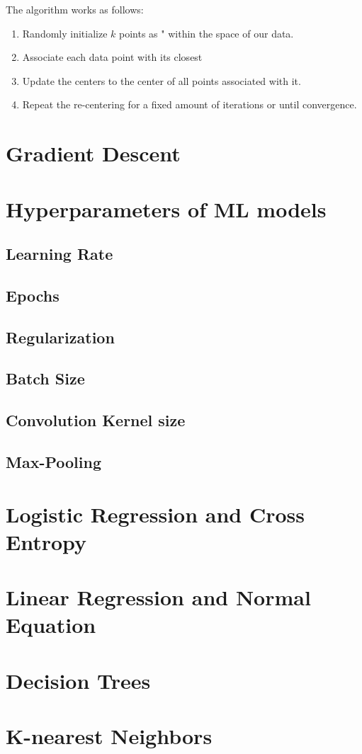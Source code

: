 The algorithm works as follows:
\begin{enumerate}
    \item Randomly initialize $k$ points as " within the space of our data.
    \item Associate each data point with its closest 
    \item Update the centers to the center of all points associated with it.
    \item Repeat the re-centering for a fixed amount of iterations or until convergence.
\end{enumerate}

\section{Gradient Descent}

\section{Hyperparameters of ML models}

\subsection{Learning Rate}
\subsection{Epochs}
\subsection{Regularization}
\subsection{Batch Size}
\subsection{Convolution Kernel size}
\subsection{Max-Pooling}

\section{Logistic Regression and Cross Entropy}


\section{Linear Regression and Normal Equation}


\section{Decision Trees}


\section{K-nearest Neighbors}
